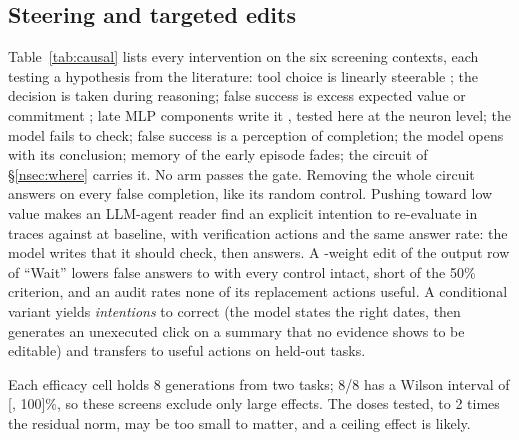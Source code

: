 
\subsection{Steering and targeted edits}
\label{nsec:steer}
Table~\ref{tab:causal} lists every intervention on the six screening contexts, each testing a hypothesis from the literature: tool choice is linearly steerable \citep{wu2026toolcalling}; the decision is taken during reasoning; false success is excess expected value or commitment \citep{jiang2026value,kumaran2026commit}; late MLP components write it \citep{dutta2026termination}, tested here at the neuron level; the model fails to check; false success is a perception of completion; the model opens with its conclusion; memory of the early episode fades; the circuit of \S\ref{nsec:where} carries it. No arm passes the gate. Removing the whole circuit answers on every false completion, like its random control. Pushing toward low value makes an LLM-agent reader find an explicit intention to re-evaluate in \doubtPushFsPos{} \fsp{} traces against \doubtBaseFsPos{} at baseline, with \doubtPushStrict{} verification actions and the same answer rate: the model writes that it should check, then answers. A \waitWeights-weight edit of the output row of ``Wait'' lowers false answers to \waitFsp{} with every control intact, short of the 50\% criterion, and an audit rates none of its replacement actions useful. A conditional variant yields \emph{intentions} to correct (the model states the right dates, then generates an unexecuted click on a summary that no evidence shows to be editable) and transfers to \hfourOutUseful{} useful actions on held-out tasks.

Each efficacy cell holds 8 generations from two tasks; 8/8 has a Wilson interval of [\wilsonEightLo, 100]\%, so these screens exclude only large effects. The doses tested, \doseSixteen{} to 2 times the residual norm, may be too small to matter, and a ceiling effect is likely.


